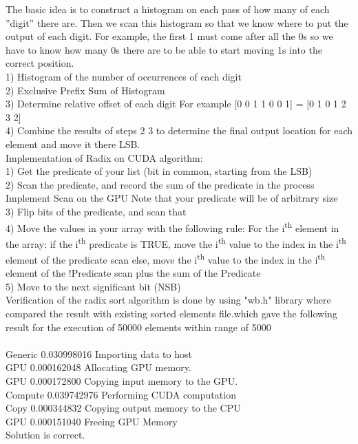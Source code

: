 \documentclass[conference]{IEEEtran}
\begin{document}
The basic idea is to construct a histogram on each pass
of how many of each ”digit” there are. Then we scan this
histogram so that we know where to put the output of each
digit. For example, the first 1 must come after all the 0s so
we have to know how many 0s there are to be able to start
moving 1s into the correct position.
\\1) Histogram of the number of occurrences of each digit
\\2) Exclusive Prefix Sum of Histogram
\\3) Determine relative offset of each digit
For example [0 0 1 1 0 0 1] = [0 1 0 1 2 3 2]
\\4) Combine the results of steps 2 3 to determine the final
output location for each element and move it there LSB.\\

Implementation of Radix on CUDA algorithm:
\\1) Get the predicate of your list (bit in common, starting
from the LSB)
\\2) Scan the predicate, and record the sum of the predicate in
the process
Implement Scan on the GPU
Note that your predicate will be of arbitrary size
\\3) Flip bits of the predicate, and scan that
\\4) Move the values in your array with the following rule:
For the i\textsuperscript{th} element in the array:
if the i\textsuperscript{th} predicate is TRUE, move the i\textsuperscript{th} value to the index
in the i\textsuperscript{th} element of the predicate scan
else, move the i\textsuperscript{th} value to the index in the i\textsuperscript{th} element of the
!Predicate scan plus the sum of the Predicate
\\5) Move to the next significant bit (NSB)\\

Verification of the radix sort algorithm is done by using "wb.h" library where 
compared the result with existing sorted elements file.which gave the following result for the execution of 50000 elements within range of 5000
\\
\\ Generic 0.030998016 Importing data to host
\\ GPU     0.000162048 Allocating GPU memory.
\\ GPU     0.000172800 Copying input memory to the GPU.
\\ Compute 0.039742976 Performing CUDA computation
\\ Copy    0.000344832 Copying output memory to the CPU
\\ GPU    0.000151040 Freeing GPU Memory
\\ Solution is correct.
\end{document}
